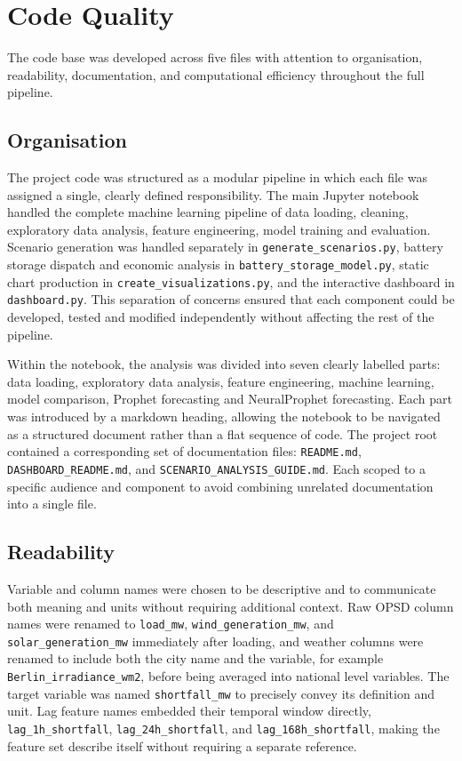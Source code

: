 \documentclass[conference]{IEEEtran}
\begin{document}
 
\section{Code Quality}
 
The code base was developed across five files with attention to organisation, readability, documentation, and computational efficiency throughout the full pipeline.
 
\subsection{Organisation}
 
The project code was structured as a modular pipeline in which each file was assigned a single, clearly defined responsibility. The main Jupyter notebook handled the complete machine learning pipeline of data loading, cleaning, exploratory data analysis, feature engineering, model training and evaluation. Scenario generation was handled separately in \texttt{generate\_scenarios.py}, battery storage dispatch and economic analysis in \texttt{battery\_storage\_model.py}, static chart production in \texttt{create\_visualizations.py}, and the interactive dashboard in \texttt{dashboard.py}. This separation of concerns ensured that each component could be developed, tested and modified independently without affecting the rest of the pipeline.
 
Within the notebook, the analysis was divided into seven clearly labelled parts: data loading, exploratory data analysis, feature engineering, machine learning, model comparison, Prophet forecasting and NeuralProphet forecasting. Each part was introduced by a markdown heading, allowing the notebook to be navigated as a structured document rather than a flat sequence of code. The project root contained a corresponding set of documentation files: \texttt{README.md}, \texttt{DASHBOARD\_README.md}, and \texttt{SCENARIO\_ANALYSIS\_GUIDE.md}. Each scoped to a specific audience and component to avoid combining unrelated documentation into a single file.
 
\subsection{Readability}
 
Variable and column names were chosen to be descriptive and to communicate both meaning and units without requiring additional context. Raw OPSD column names were renamed to \texttt{load\_mw}, \texttt{wind\_generation\_mw}, and \texttt{solar\_generation\_mw} immediately after loading, and weather columns were renamed to include both the city name and the variable, for example \texttt{Berlin\_irradiance\_wm2}, before being averaged into national level variables. The target variable was named \texttt{shortfall\_mw} to precisely convey its definition and unit. Lag feature names embedded their temporal window directly, \texttt{lag\_1h\_shortfall}, \texttt{lag\_24h\_shortfall}, and \texttt{lag\_168h\_shortfall}, making the feature set describe itself without requiring a separate reference.
 
\end{document}
